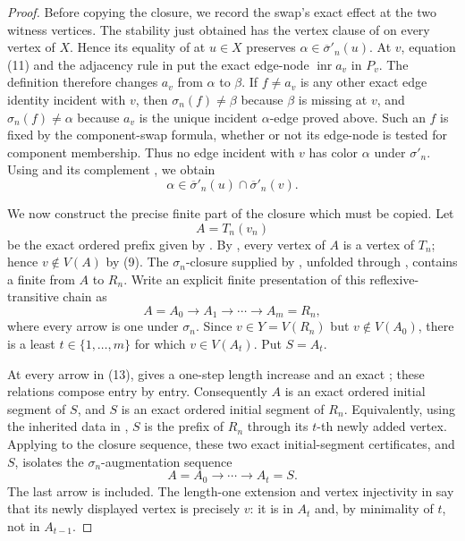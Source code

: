 \begin{proof}
Before copying the closure, we record the swap's exact effect at the two
witness vertices.  The stability just obtained has the vertex clause of
 on every vertex of $X$.  Hence its equality of
 at $u\in X$ preserves
$\alpha\in\overline\sigma'_n(u)$.  At $v$, equation (11) and the adjacency
rule in  put the exact edge-node
$\operatorname{inr}a_v$ in $P_v$.  The definition
 therefore changes $a_v$ from $\alpha$ to
$\beta$.  If $f\ne a_v$ is any other exact edge identity incident with
$v$, then $\sigma_n(f)\ne\beta$ because $\beta$ is missing at $v$, and
$\sigma_n(f)\ne\alpha$ because $a_v$ is the unique incident
$\alpha$-edge proved above.  Such an $f$ is fixed by the component-swap
formula, whether or not its edge-node is tested for component membership.
Thus no edge incident with $v$ has color $\alpha$ under $\sigma'_n$.
Using  and its complement
, we obtain
\[
       \alpha\in\overline\sigma'_n(u)
          \cap\overline\sigma'_n(v).                         \tag{12}
\]

We now construct the precise finite part of the closure which must be
copied.  Let
\[
 A=T_n(v_n)
\]
be the exact ordered prefix given by .  By
, every vertex of $A$ is a vertex of $T_n$;
hence $v\notin V(A)$ by (9).  The $\sigma_n$-closure supplied by
, unfolded through
, contains a finite
 from $A$ to $R_n$.  Write an
explicit finite presentation of this reflexive-transitive chain as
\[
 A=A_0\longrightarrow A_1\longrightarrow\cdots
   \longrightarrow A_m=R_n,                                 \tag{13}
\]
where every arrow is one  under
$\sigma_n$.  Since $v\in Y=V(R_n)$ but $v\notin V(A_0)$, there is a least
$t\in\{1,\ldots,m\}$ for which $v\in V(A_t)$.  Put $S=A_t$.

At every arrow in (13),  gives a one-step
length increase and an exact ; these
relations compose entry by entry.  Consequently $A$ is an exact ordered
initial segment of $S$, and $S$ is an exact ordered initial segment of
$R_n$.  Equivalently, using the inherited data in
, $S$ is the prefix of $R_n$ through its
$t$-th newly added vertex.  Applying
 to the closure sequence,
these two exact initial-segment certificates, and $S$, isolates the
$\sigma_n$-augmentation sequence
\[
                    A=A_0\longrightarrow\cdots\longrightarrow A_t=S.
                                                               \tag{14}
\]
The last arrow is included.  The length-one extension and vertex
injectivity in  say that its newly displayed vertex
is precisely $v$: it is in $A_t$ and, by minimality of $t$, not in
$A_{t-1}$.


\end{proof}
